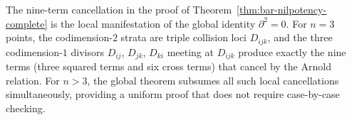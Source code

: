 \begin{remark}
\label{rem:nine-term-global}
The nine-term cancellation in the proof of
Theorem~\ref{thm:bar-nilpotency-complete} is the local manifestation of
the global identity $\partial^2 = 0$.  For $n = 3$ points, the
codimension-$2$ strata are triple collision loci $D_{ijk}$, and the three
codimension-$1$ divisors $D_{ij}$, $D_{jk}$, $D_{ki}$ meeting at $D_{ijk}$
produce exactly the nine terms (three squared terms and six cross terms) that
cancel by the Arnold relation.  For $n > 3$, the global theorem subsumes all
such local cancellations simultaneously, providing a uniform proof that does
not require case-by-case checking.
\end{remark}

